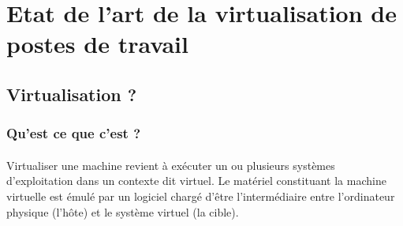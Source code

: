 
\section{Etat de l'art de la virtualisation de postes de travail}

\subsection{Virtualisation ?}

\subsubsection{Qu'est ce que c'est ?}

\paragraph{} Virtualiser une machine revient à exécuter un ou plusieurs
systèmes d'exploitation dans un contexte dit virtuel. Le matériel constituant la
machine virtuelle est émulé par un logiciel chargé d'être l'intermédiaire entre
l'ordinateur physique (l'hôte) et le système virtuel (la cible).

